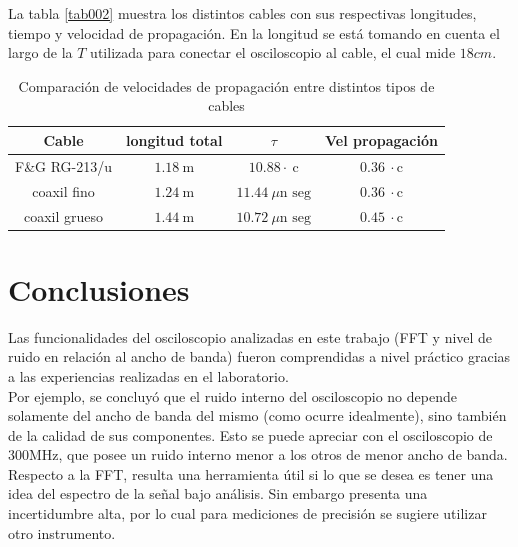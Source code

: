\documentclass[a4paper,10pt]{article}
\begin{document}
	\indent La tabla \ref{tab002} muestra los distintos cables con sus 
	respectivas longitudes, tiempo y velocidad de propagación. En
	la longitud se está tomando en cuenta el largo de la $T$ utilizada para 
	conectar el osciloscopio al cable, el cual mide $18 cm$. \\
	
	\begin{table}[!htp]
		\centering
		\begin{tabular}{|c|c|c|c|}
			\hline
    		Cable & longitud total & $\tau$ & Vel propagación \\
			\hline
			F\&G RG-213/u & $1.18~\text{m}$ & $10.88\cdot~\text{c}$ & 
			$0.36~\cdot\text{c}$ \\
			\hline 
			coaxil fino & $1.24~\text{m}$ & $11.44~\mu\text{n seg}$ &
			$0.36~\cdot\text{c}$ \\
			\hline
			coaxil grueso & $1.44~\text{m}$ & $10.72~\mu\text{n seg}$ & 
			$0.45~\cdot\text{c}$ \\
			\hline
		\end{tabular}
		\caption{Comparación de velocidades de propagación entre distintos 
		tipos de cables} \label{tab001}
	\end{table}
 
	\newpage 
	\section{Conclusiones}
	Las funcionalidades del osciloscopio analizadas en este trabajo (FFT y nivel
	de ruido en relaci\'on al ancho de banda) fueron comprendidas a nivel 
	pr\'actico gracias a las experiencias realizadas en el laboratorio.\\
	\indent Por ejemplo, se concluy\'o que el ruido interno del osciloscopio no 
	depende solamente del ancho de banda del mismo (como ocurre idealmente), 
	sino también de la calidad de sus componentes. Esto se puede apreciar con el
	osciloscopio de 300MHz, que posee un ruido interno menor a los otros de 
	menor ancho de banda. \\
	\indent Respecto a la FFT, resulta una herramienta \'util si lo que se desea
	es tener una idea del espectro de la se\~nal bajo an\'alisis. Sin embargo 
	presenta una incertidumbre alta, por lo cual para mediciones de precisi\'on 
	se sugiere utilizar otro instrumento.
\end{document}
